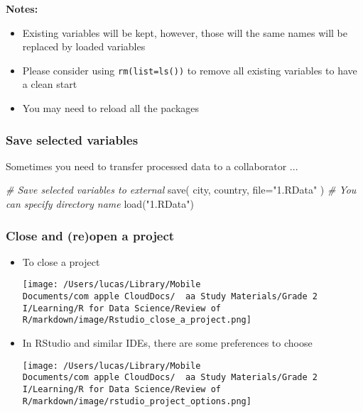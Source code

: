 \documentclass[
]{article}
\let\oldincludegraphics\includegraphics
\renewcommand{\includegraphics}[2][]{\begin{center}\oldincludegraphics[#1]{#2}\end{center}}
\newenvironment{Shaded}{}{}
\newcommand{\AttributeTok}[1]{\textcolor[rgb]{0.49,0.56,0.16}{#1}}
\newcommand{\CommentTok}[1]{\textcolor[rgb]{0.38,0.63,0.69}{\textit{#1}}}
\newcommand{\FunctionTok}[1]{\textcolor[rgb]{0.02,0.16,0.49}{#1}}
\newcommand{\NormalTok}[1]{#1}
\newcommand{\StringTok}[1]{\textcolor[rgb]{0.25,0.44,0.63}{#1}}
\begin{document}
\textbf{Notes:}

\begin{itemize}
\item
  Existing variables will be kept, however, those will the same names
  will be replaced by loaded variables
\item
  Please consider using \texttt{rm(list=ls())} to remove all existing
  variables to have a clean start
\item
  You may need to reload all the packages
\end{itemize}

\hypertarget{save-selected-variables}{%
\subsubsection{Save selected variables}\label{save-selected-variables}}

Sometimes you need to transfer processed data to a collaborator ...

\begin{Shaded}
\begin{Highlighting}[]
\CommentTok{\# Save selected variables to external}
\FunctionTok{save}\NormalTok{(}
\NormalTok{  city, }
\NormalTok{  country, }
  \AttributeTok{file=}\StringTok{"1.RData"}
\NormalTok{)}
\CommentTok{\# You can specify directory name}
\FunctionTok{load}\NormalTok{(}\StringTok{"1.RData"}\NormalTok{)}
\end{Highlighting}
\end{Shaded}

\hypertarget{close-and-reopen-a-project}{%
\subsubsection{Close and (re)open a
project}\label{close-and-reopen-a-project}}

\begin{itemize}
\item
  To close a project

  \texttt{[image: /Users/lucas/Library/Mobile Documents/com~apple~CloudDocs/~~aa Study Materials/Grade 2 I/Learning/R for Data Science/Review of R/markdown/image/Rstudio\_close\_a\_project.png]}
\item
  In RStudio and similar IDEs, there are some preferences to choose

  \texttt{[image: /Users/lucas/Library/Mobile Documents/com~apple~CloudDocs/~~aa Study Materials/Grade 2 I/Learning/R for Data Science/Review of R/markdown/image/rstudio\_project\_options.png]}
\end{itemize}
\end{document}
